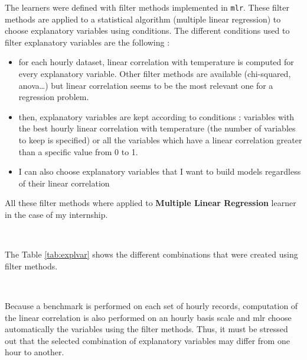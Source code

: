 \documentclass[12pt,twoside]{reedthesis}
\providecommand{\tightlist}{%
  \setlength{\itemsep}{0pt}\setlength{\parskip}{0pt}}
\theoremstyle{definition}
\theoremstyle{definition}
\theoremstyle{definition}
\theoremstyle{remark}
\begin{document}
The learners were defined with filter methods implemented in
\texttt{mlr}. These filter methods are applied to a statistical
algorithm (multiple linear regression) to choose explanatory variables
using conditions. The different conditions used to filter explanatory
variables are the following :
\begin{itemize}
\tightlist
\item
  for each hourly dataset, linear correlation with temperature is
  computed for every explanatory variable. Other filter methods are
  available (chi-squared, anova\ldots{}) but linear correlation seems to
  be the most relevant one for a regression problem.
\item
  then, explanatory variables are kept according to conditions :
  variables with the best hourly linear correlation with temperature
  (the number of variables to keep is specified) or all the variables
  which have a linear correlation greater than a specific value from 0
  to 1.
\item
  I can also choose explanatory variables that I want to build models
  regardless of their linear correlation
\end{itemize}
All these filter methods where applied to \textbf{Multiple Linear
Regression} learner in the case of my internship.

~

The Table \ref{tab:explvar} shows the different combinations that were
created using filter methods.

~

Because a benchmark is performed on each set of hourly records,
computation of the linear correlation is also performed on an hourly
basis scale and mlr choose automatically the variables using the filter
methods. Thus, it must be stressed out that the selected combination of
explanatory variables may differ from one hour to another.

~
\end{document}
